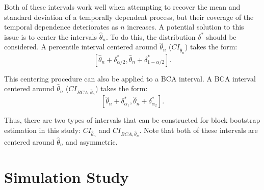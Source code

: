 \documentclass[12pt, letterpaper, titlepage]{article}
\begin{document}
	
Both of these intervals work well when attempting to recover the mean and standard deviation of a temporally dependent process, 
but their coverage of the temporal dependence deteriorates as $n$ increases. A potential solution to this issue is to center the intervals 
$\hat{\theta}_{n}$. To do this, the distribution $\delta^*$ should be considered. A percentile interval 
centered around $\hat{\theta}_{n}$ ($CI_{\hat{\theta}_{n}}$) takes the form:
\[ [\hat{\theta}_{n} + \delta^*_{\alpha/2}, \hat{\theta}_{n} + \delta^*_{1 - \alpha/2}].\] 


This centering procedure can also be applied to a BCA interval. A BCA interval centered around $\hat{\theta}_{n}$ ($CI_{BCA, \hat{\theta}_{n}}$) takes the form:
\[ [\hat{\theta}_{n} + \delta^*_{\alpha_1}, \hat{\theta}_{n} + \delta^*_{\alpha_2}].\] 

Thus, there are two types of intervals that can be constructed for block bootstrap estimation in this study: 
$CI_{\hat{\theta}_{n}}$ and $CI_{BCA, \hat{\theta}_{n}}$. Note that both of these intervals are centered around $\hat{\theta}_{n}$ and asymmetric. 


\section{Simulation Study}
\label{sec:simstudy}

\end{document}
